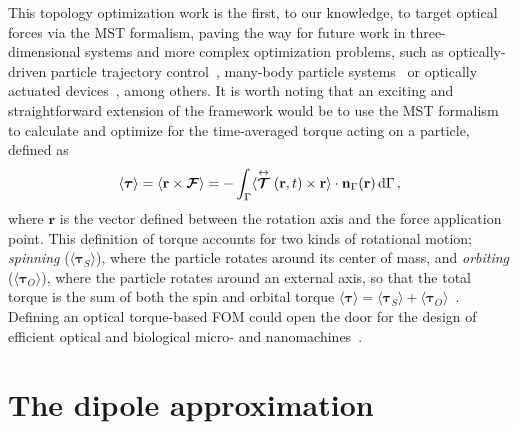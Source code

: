 This topology optimization work is the first, to our knowledge, to 
target optical forces via the MST formalism, paving the way for future work in three-dimensional systems and more complex optimization problems, such as optically-driven particle
trajectory control~\cite{zemanek_perspective_2019, macdonald_microfluidic_2003, shilkin_directional_2017}, many-body particle systems~\cite{bechinger_active_2016, chang_colloquium_2018} or optically actuated devices~\cite{ivanyi_optically_2024}, among others. It is worth noting that an exciting and straightforward extension of the framework would be to use the MST formalism to calculate and optimize for the time-averaged torque acting on a particle, defined as~\cite{novotny}
\begin{equation}\label{eq:torque}
    \langle \bm{\tau} \rangle = \langle \mathbf{r} \times \bm{\mathcal{F}} \rangle = - \int_{\Gamma} \langle \stackrel{\leftrightarrow}{\bm{\mathcal{T}}}(\mathbf{r},t)
    \times \mathbf{r} \rangle \cdot \mathbf{n}_{\Gamma}(\mathbf{r}) \mathop{}\!\text{d}\Gamma \,,
\end{equation}
where $\mathbf{r}$ is the vector defined between the rotation axis and the force application point. This definition of torque accounts
for two kinds of rotational motion; \textit{spinning} ($\langle \bm{\tau}_S \rangle$), where the particle rotates around its center of mass,
and \textit{orbiting} ($\langle \bm{\tau}_O \rangle$), where the particle rotates around an external axis, so that the total torque is the sum
of both the spin and orbital torque $\langle \bm{\tau} \rangle = \langle \bm{\tau}_S \rangle + \langle \bm{\tau}_O \rangle$~\cite{torque}.  Defining 
an optical torque-based FOM could open the door for the design of efficient optical and biological micro- and nanomachines~\cite{rotating, gluck}.

\section{The dipole approximation~\cite{ownpub1, ownpub3}}\label{sec:dip}

